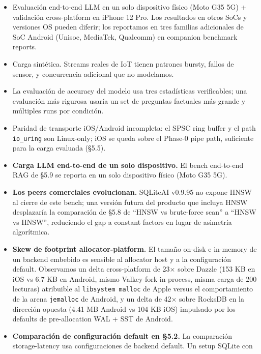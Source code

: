 \begin{itemize}
  asserts que atrapan una regresión futura, y una auditoría de cada otro
  benchmark on-device en el repo por el mismo bug pattern) está documentada en
  el Apéndice B (\texttt{research/paper/appendix\_b\_harness\_postmortem.md}).
\item
  Evaluación end-to-end LLM en un solo dispositivo físico (Moto G35 5G) +
  validación cross-platform en iPhone 12 Pro. Los resultados en otros SoCs y
  versiones OS pueden diferir; los reportamos en tres familias adicionales de
  SoC Android (Unisoc, MediaTek, Qualcomm) en companion benchmark reports.
\item
  Carga sintética. Streams reales de IoT tienen patrones bursty, fallos de
  sensor, y concurrencia adicional que no modelamos.
\item
  La evaluación de accuracy del modelo usa tres estadísticas verificables; una
  evaluación más rigurosa usaría un set de preguntas factuales más grande y
  múltiples runs por condición.
\item
  Paridad de transporte iOS/Android incompleta: el SPSC ring buffer y el path
  \texttt{io\_uring} son Linux-only; iOS se queda sobre el Phase-0 pipe path,
  suficiente para la carga evaluada (§5.5).
\item
  \textbf{Carga LLM end-to-end de un solo dispositivo.} El bench end-to-end RAG
  de §5.9 se reporta en un solo dispositivo físico (Moto G35 5G).
\item
  \textbf{Los peers comerciales evolucionan.} SQLiteAI v0.9.95 no expone HNSW al
  cierre de este bench; una versión futura del producto que incluya HNSW
  desplazaría la comparación de §5.8 de ``HNSW vs brute-force scan'' a ``HNSW vs
  HNSW'', reduciendo el gap a constant factors en lugar de asimetría
  algorítmica.
\item
  \textbf{Skew de footprint allocator-platform.} El tamaño on-disk e in-memory
  de un backend embebido es sensible al allocator host y a la configuración
  default. Observamos un delta cross-platform de 23× sobre Dazzle (153 KB en iOS
  vs 6.7 KB en Android, mismo Valkey-fork in-process, misma carga de 200
  lecturas) atribuible al \texttt{libsystem\ malloc} de Apple versus el
  comportamiento de la arena \texttt{jemalloc} de Android, y un delta de 42×
  sobre RocksDB en la dirección opuesta (4.41 MB Android vs 104 KB iOS)
  impulsado por los defaults de pre-allocation WAL + SST de Android.
\item
  \textbf{Comparación de configuración default en §5.2.} La comparación
  storage-latency usa configuraciones de backend default. Un setup SQLite con

\end{itemize}
